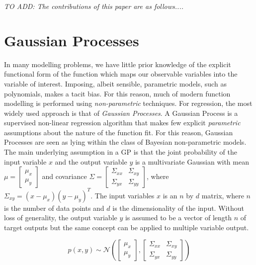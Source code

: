 \documentclass[a4paper,12pt]{article}
\begin{document}
\textit{TO ADD: The contributions of this paper are as follows....}

\section{Gaussian Processes}
\label{sec-gaussian-process}

In many modelling problems, we have little prior knowledge of the explicit functional form of the function which maps our observable variables into the variable of interest. Imposing, albeit sensible, parametric models, such as polynomials, makes a tacit bias. For this reason, much of modern function modelling is performed using \emph{non-parametric} techniques. For regression, the most widely used approach is that of \emph{Gaussian Processes}.
A Gaussian Process is a supervised non-linear regression algorithm that makes few explicit \emph{parametric} assumptions about the nature of the function fit. For this reason, Gaussian Processes are seen as lying within the class of Bayesian non-parametric models. The main underlying assumption in a GP is that the joint probability of the input variable $x$ and the output variable $y$ is a multivariate Gaussian with mean $\mu=\begin{bmatrix} \mu_{x}\\ \mu_{y}\end{bmatrix}$ and covariance $\Sigma=\begin{bmatrix}\Sigma_{xx} & \Sigma_{xy}\\\Sigma_{yx} & \Sigma_{yy} \end{bmatrix}$, where $\Sigma_{xy}=(x-\mu_{x})(y-\mu_{y})^{T}$. The input variables $x$ is an $n$ by $d$ matrix, where $n$ is the number of data points and $d$ is the dimensionality of the input. Without loss of generality, the output variable $y$ is assumed to be a vector of length $n$ of target outputs but the same concept can be applied to multiple variable output.

\begin{equation}
p\left ( x,y\right) \sim \mathcal{N} \left ( \begin{bmatrix}\mu_{x}\\\mu_{y} \end{bmatrix}, \begin{bmatrix}\Sigma_{xx} & \Sigma_{xy}\\\Sigma_{yx} & \Sigma_{yy} \end{bmatrix}\right )
\end{equation}
\end{document}
